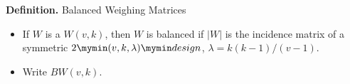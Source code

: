 \documentclass{beamer}
\newcommand{\bibd}[1]{2 \mymin #1 \mymin design}
\newcommand{\abs}[1]{|#1|}
\begin{document}



\begin{frame}

  \begin{block}{{\bf Definition.} Balanced Weighing Matrices}
    \begin{itemize}
    \item If $W$ is a $W(v,k)$, then $W$ is balanced if $\abs{W}$ is the incidence
    matrix of a symmetric $\bibd{(v,k,\lambda)}$, $\lambda=k(k-1)/(v-1)$.
    \item Write $BW(v,k)$.
    \end{itemize}
  \end{block}

\end{frame}
\end{document}
